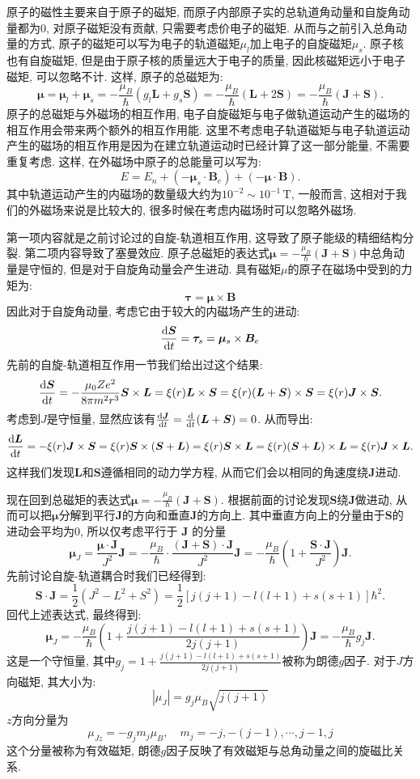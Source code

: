 原子的磁性主要来自于原子的磁矩, 而原子内部原子实的总轨道角动量和自旋角动量都为0, 对原子磁矩没有贡献, 只需要考虑价电子的磁矩. 从而与之前引入总角动量的方式, 原子的磁矩可以写为电子的轨道磁矩$\mu_l$加上电子的自旋磁矩$\mu_s$. 原子核也有自旋磁矩, 但是由于原子核的质量远大于电子的质量, 因此核磁矩远小于电子磁矩, 可以忽略不计. 这样, 原子的总磁矩为:
\[
\bm{\mu}  = \bm{\mu}_l + \bm{\mu}_s = -\frac{\mu_B}{\hbar}(g_l \bm{L} + g_s \bm{S}) = -\frac{\mu_B}{\hbar} (\bm{L} + 2\bm{S}) = -\frac{\mu_B}{\hbar} (\bm{J}+\bm{S}).
\]
原子的总磁矩与外磁场的相互作用, 电子自旋磁矩与电子做轨道运动产生的磁场的相互作用会带来两个额外的相互作用能. 这里不考虑电子轨道磁矩与电子轨道运动产生的磁场的相互作用是因为在建立轨道运动时已经计算了这一部分能量, 不需要重复考虑. 这样, 在外磁场中原子的总能量可以写为:
\[
E = E_n + (-\bm{\mu}_s\cdot \bm{B}_e) + (-\bm{\mu}\cdot \bm{B}).
\]
其中轨道运动产生的内磁场的数量级大约为$10^{-2}\sim 10^{-1}\,\mathrm{T}$, 一般而言, 这相对于我们的外磁场来说是比较大的, 很多时候在考虑内磁场时可以忽略外磁场.

第一项内容就是之前讨论过的自旋-轨道相互作用, 这导致了原子能级的精细结构分裂. 第二项内容导致了塞曼效应. 原子总磁矩的表达式$\bm{\mu} = -\frac{\mu_B}{\hbar}(\bm{J}+\bm{S})$中总角动量是守恒的, 但是对于自旋角动量会产生进动. 具有磁矩$\mu$的原子在磁场中受到的力矩为:
\[
\bm{\tau} = \bm{\mu} \times \bm{B}
\]
因此对于自旋角动量, 考虑它由于较大的内磁场产生的进动:
\[
\frac{\mathop{}\!\mathrm{d} \bm{S}}{\mathop{}\!\mathrm{d} t} = \bm{\tau}_s = \bm{\mu}_s \times \bm{B}_e
\]
先前的自旋-轨道相互作用一节我们给出过这个结果:
\[
\frac{\mathop{}\!\mathrm{d} \bm{S}}{\mathop{}\!\mathrm{d} t} = -\frac{\mu_0 Z e^2}{8 \pi m^2 r^3} \bm{S} \times \bm{L} = \xi(r) \bm{L} \times \bm{S} = \xi(r)(\bm{L}+\bm{S})\times \bm{S} = \xi(r)\bm{J} \times \bm{S}.
\]
考虑到$J$是守恒量, 显然应该有$\frac{\mathop{}\!\mathrm{d} \bm{J}}{\mathop{}\!\mathrm{d} t} = \frac{\mathop{}\!\mathrm{d}}{\mathop{}\!\mathrm{d} t}(\bm{L}+\bm{S}) = 0$. 从而导出:
\[
\frac{\mathop{}\!\mathrm{d} \bm{L}}{\mathop{}\!\mathrm{d} t} = -\xi(r) \bm{J} \times \bm{S} = \xi(r)\bm{S} \times (\bm{S}+\bm{L}) = \xi(r)\bm{S} \times \bm{L} = \xi(r)(\bm{S}+\bm{L}) \times \bm{L} = \xi(r)\bm{J} \times \bm{L}.
\]
这样我们发现$\bm{L}$和$\bm{S}$遵循相同的动力学方程, 从而它们会以相同的角速度绕$\bm{J}$进动.

现在回到总磁矩的表达式$\bm{\mu} = -\frac{\mu_B}{\hbar}(\bm{J}+\bm{S})$. 根据前面的讨论发现$\bm{S}$绕$\bm{J}$做进动, 从而可以把$\bm{\mu}$分解到平行$\bm{J}$的方向和垂直$\bm{J}$的方向上. 其中垂直方向上的分量由于$\bm{S}$的进动会平均为0, 所以仅考虑平行于 $\bm{J}$ 的分量
\[
\bm{\mu}_J = \frac{\bm{\mu} \cdot \bm{J}}{J^2} \bm{J} = -\frac{\mu_B}{\hbar}  \cdot \frac{(\bm{J}+\bm{S})\cdot\bm{J}}{J^2} \bm{J} = -\frac{\mu_B}{\hbar} (1+\frac{\bm{S}\cdot \bm{J}}{J^2}) \bm{J}.
\]
先前讨论自旋-轨道耦合时我们已经得到:
\[
\bm{S} \cdot \bm{J} = \frac{1}{2}(J^2 - L^2 + S^2) = \frac{1}{2}[j(j+1) - l(l+1) + s(s+1)]\hbar^2.
\]
回代上述表达式, 最终得到:
\[
\bm{\mu}_J = -\frac{\mu_B}{\hbar} (1+\frac{j(j+1) - l(l+1) + s(s+1)}{2j(j+1)}) \bm{J} = -\frac{\mu_B}{\hbar} g_j \bm{J}.
\]
这是一个守恒量, 其中$g_j = 1+\frac{j(j+1) - l(l+1) + s(s+1)}{2j(j+1)}$被称为朗德$g$因子. 对于$J$方向磁矩, 其大小为:
\[
|\mu_J|=g_j\mu_B\sqrt{j(j+1)}
\]
$z$方向分量为
\[
\mu_{Jz} = -g_j m_j \mu_B, \quad m_j = -j, -(j-1), \cdots, j-1, j
\]
这个分量被称为有效磁矩, 朗德$g$因子反映了有效磁矩与总角动量之间的旋磁比关系.

